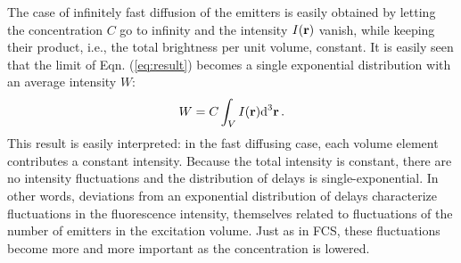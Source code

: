 The case of infinitely fast diffusion of the emitters is easily obtained by letting the concentration $C$ go to infinity and the intensity $I({\mathbf{r}})$ vanish, while keeping their product, i.e., the total brightness per unit volume, constant. It is easily seen that the limit of Eqn. (\ref{eq:result}) becomes a single exponential distribution with an average intensity $W$:
\begin{equation}
W = C \int_V{I({\mathbf{r}})\mbox{d}^3{\mathbf{r}}}\,.
\label{eq:intensity2}
\end{equation} 
This result is easily interpreted: in the fast diffusing case, each volume element contributes a constant intensity. Because the total intensity is constant, there are no intensity fluctuations and the distribution of delays is single-exponential. In other words, deviations from an exponential distribution of delays characterize fluctuations in the fluorescence intensity, themselves related to fluctuations of the number of emitters in the excitation volume. Just as in FCS, these fluctuations become more and more important as the concentration is lowered.


%
%
%
%
%


